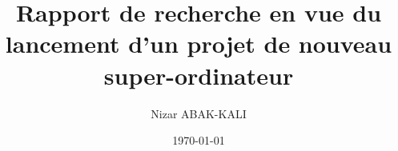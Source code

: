 \documentclass[a4paper,12pt,final]{article}
\title{Rapport de recherche en vue du lancement d'un projet de nouveau super-ordinateur}
\author{Nizar ABAK-KALI}
\date{\today}
\begin{document}


\cleardoublepage %

\tableofcontents
\sloppy

\cleardoublepage 



\cleardoublepage



\cleardoublepage



\cleardoublepage



\cleardoublepage



\cleardoublepage

%
\end{document}
